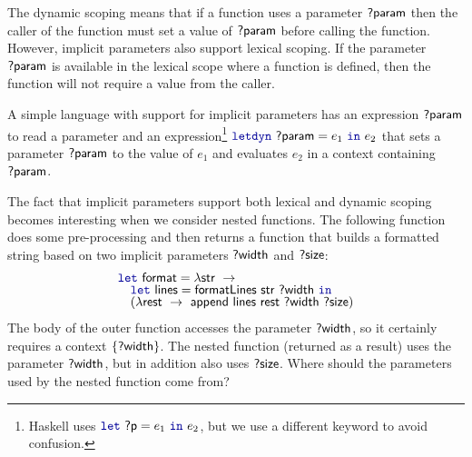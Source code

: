 The dynamic scoping means that if a function uses a parameter $\textnormal{\sffamily ?param}$ then the caller of the
function must set a value of $\textnormal{\sffamily ?param}$ before calling the function. However, implicit
parameters also support lexical scoping. If the parameter $\textnormal{\sffamily ?param}$ is available in the
lexical scope where a function is defined, then the function will not require a value from the caller.

A simple language with support for implicit parameters has an expression $\textnormal{\sffamily ?param}$ to read a
parameter and an expression\footnote{Haskell uses $\kvd{let}~\ident{?p} = e_1~\kvd{in}~e_2$, but we use a
different keyword to avoid confusion.} $\kvd{letdyn}~\ident{?param} = e_1~\kvd{in}~e_2$ that sets a
parameter $\textnormal{\sffamily ?param}$ to the value of $e_1$ and evaluates $e_2$ in a context containing
$\textnormal{\sffamily ?param}$.

The fact that implicit parameters support both lexical and dynamic scoping becomes interesting
when we consider nested functions. The following function does some pre-processing and then returns a
function that builds a formatted string based on two implicit parameters $\textnormal{\sffamily ?width}$ and
$\textnormal{\sffamily ?size}$:
%
\begin{equation*}
\begin{array}{l}
\kvd{let}~\ident{format} = \lambda \ident{str}~\rightarrow \\[-0.25em]
\quad \kvd{let}~\ident{lines} = \ident{formatLines}~\ident{str}~\ident{?width}~\kvd{in}\\[-0.25em]
\quad (\lambda \ident{rest}~\rightarrow~\ident{append}~
         \ident{lines}~\ident{rest}~\ident{?width}~\ident{?size})
\end{array}
\end{equation*}
%
The body of the outer function accesses the parameter $\textnormal{\sffamily ?width}$, so it certainly requires a context
$\{ \textnormal{\sffamily ?width} \}$. The nested function (returned as a result) uses the parameter
$\textnormal{\sffamily ?width}$, but in addition also uses $\textnormal{\sffamily ?size}$. Where should the parameters used by the
nested function come from?

